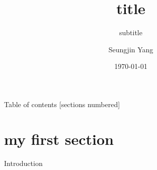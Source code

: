 \documentclass[10pt]{beamer}
\title{title}
\subtitle{subtitle}
\author{Seungjin Yang}
\institute[VFU]{University of Seoul}
\date{\today}
\begin{document}
\begin{frame}
    \maketitle
\end{frame}

\begin{frame}{Table of contents}
  [sections numbered]
  \tableofcontents%
\end{frame}

\section{my first section}

\begin{frame}[fragile]{Introduction}
\end{frame}
\end{document}
